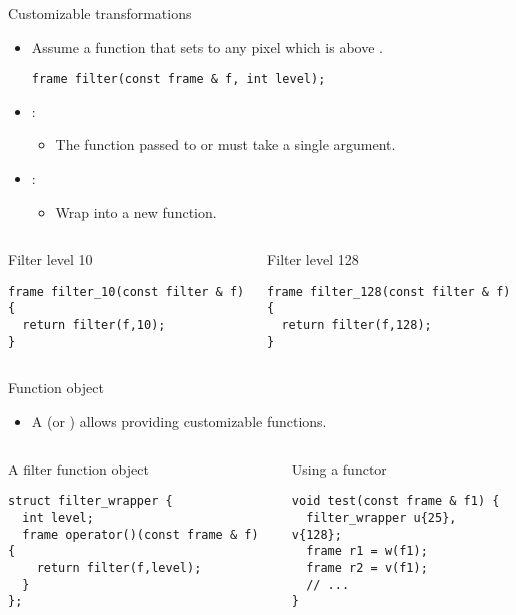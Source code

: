 \begin{frame}[t,fragile]{Customizable transformations}
\begin{itemize}
  \item Assume a  function that sets to  any pixel
        which is above .
\begin{lstlisting}
frame filter(const frame & f, int level);
\end{lstlisting}
  \pause
  \item {}:
    \begin{itemize}
      \item The function passed to  or 
            must take a single argument.
    \end{itemize}
  \pause
  \item {}:
    \begin{itemize}
      \item Wrap into a new function.
    \end{itemize}
\end{itemize}
\begin{columns}
\pause
\begin{block}{Filter level 10}
\begin{lstlisting}
frame filter_10(const filter & f) {
  return filter(f,10);
}
\end{lstlisting}
\end{block}
\pause
\begin{block}{Filter level 128}
\begin{lstlisting}
frame filter_128(const filter & f) {
  return filter(f,128);
}
\end{lstlisting}
\end{block}
\end{columns}
\end{frame}

\begin{frame}[t,fragile]{Function object}
\begin{itemize}
  \item A  (or ) allows providing 
        customizable functions.
\end{itemize}
\begin{columns}[T]
\begin{block}{A filter function object}
\begin{lstlisting}
struct filter_wrapper {
  int level;
  frame operator()(const frame & f) {
    return filter(f,level);
  }
};
\end{lstlisting}
\end{block}

\begin{block}{Using a functor}
\begin{lstlisting}
void test(const frame & f1) {
  filter_wrapper u{25}, v{128};
  frame r1 = w(f1);
  frame r2 = v(f1);
  // ...
}
\end{lstlisting}
\end{block}
\end{columns}
\end{frame}


